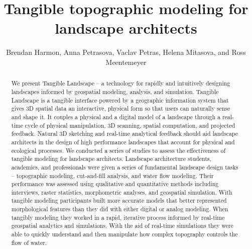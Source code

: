 \documentclass[Afour,sagev,times]{sagej} %
\begin{document}
\title{Tangible topographic modeling for landscape architects}
\author{Brendan Harmon, Anna Petrasova, Vaclav Petras, Helena Mitasova, and Ross Meentemeyer}


\begin{abstract}
We present Tangible Landscape -- a technology for rapidly and intuitively designing landscapes informed by geospatial modeling, analysis, and simulation. Tangible Landscape is a tangible interface powered by a geographic information system that gives 3D spatial data an interactive, physical form so that users can naturally sense and shape it. It couples a physical and a digital model of a landscape through a real-time cycle of physical manipulation, 3D scanning, spatial computation, and projected feedback. Natural 3D sketching and real-time analytical feedback should aid landscape architects in the design of high performance landscapes that account for physical and ecological processes. We conducted a series of studies to assess the effectiveness of tangible modeling for landscape architects. Landscape architecture students, academics, and professionals were given a series of fundamental landscape design tasks -- topographic modeling, cut-and-fill analysis, and water flow modeling. Their performance was assessed using qualitative and quantitative methods including interviews, raster statistics, morphometric analyses, and geospatial simulation. With tangible modeling participants built more accurate models that better represented morphological features than they did with either digital or analog modeling. When tangibly modeling they worked in a rapid, iterative process informed by real-time geospatial analytics and simulations. With the aid of real-time simulations they were able to quickly understand and then manipulate how complex topography controls the flow of water.
\end{abstract}

\end{document}
